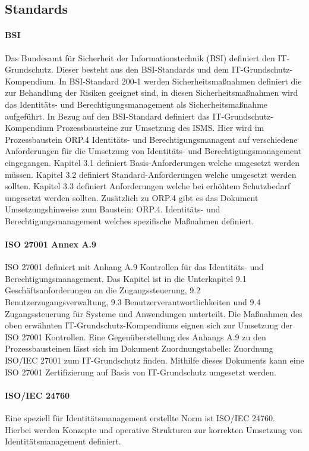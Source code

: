 \documentclass[12pt]{article}
\begin{document}
\subsection{Standards}
\paragraph{BSI}
Das Bundesamt für Sicherheit der Informationstechnik (BSI) definiert den IT-Grundschutz. Dieser besteht aus den BSI-Standards und dem IT-Grundschutz-Kompendium. In BSI-Standard 200-1 werden Sicherheitsmaßnahmen definiert die zur Behandlung der Risiken geeignet sind, in diesen Sicherheitsmaßnahmen wird das Identitäts- und Berechtigungsmanagement als Sicherheitsmaßnahme aufgeführt. In Bezug auf den BSI-Standard definiert das IT-Grundschutz-Kompendium Prozessbausteine zur Umsetzung des ISMS. Hier wird im Prozessbaustein \glqq{}ORP.4 Identitäts- und Berechtigungsmanagent\grqq{} auf verschiedene Anforderungen für die Umsetzung von Identitäts- und Berechtigungsmanagement eingegangen. Kapitel 3.1 definiert Basis-Anforderungen welche umgesetzt werden müssen. Kapitel 3.2 definiert Standard-Anforderungen welche umgesetzt werden sollten. Kapitel 3.3 definiert Anforderungen welche bei erhöhtem Schutzbedarf umgesetzt werden sollten. Zusätzlich zu ORP.4 gibt es das Dokument \glqq{}Umsetzungshinweise zum Baustein: ORP.4. Identitäts- und Berechtigungsmanagement\grqq{} welches spezifische Maßnahmen definiert.~\cite{orp4}
\paragraph{ISO 27001 Annex A.9}
ISO 27001 definiert mit Anhang A.9 Kontrollen für das Identitäts- und Berechtigungsmanagement. Das Kapitel ist in die Unterkapitel \glqq{}9.1 Geschäftsanforderungen an die Zugangssteuerung\grqq{}, \glqq{}9.2 Benutzerzugangsverwaltung\grqq{}, \glqq{}9.3 Benutzerverantwortlichkeiten\grqq{} und \glqq{}9.4 Zugangssteuerung für Systeme und Anwendungen\grqq{} unterteilt. Die Maßnahmen des oben erwähnten IT-Grundschutz-Kompendiums eignen sich zur Umsetzung der ISO 27001 Kontrollen. Eine Gegenüberstellung des Anhangs A.9 zu den Prozessbausteinen lässt sich im Dokument \glqq{}Zuordnungstabelle: Zuordnung ISO/IEC 27001 zum IT-Grundschutz\grqq{} finden. Mithilfe dieses Dokuments kann eine ISO 27001 Zertifizierung auf Basis von IT-Grundschutz umgesetzt werden.~\cite{bsi2023basis}
\paragraph{ISO/IEC 24760}
Eine speziell für Identitätsmanagement erstellte Norm ist ISO/IEC 24760. Hierbei werden Konzepte und operative Strukturen zur korrekten Umsetzung von Identitätsmanagement definiert.~\cite{isoiec24760}
\end{document}
